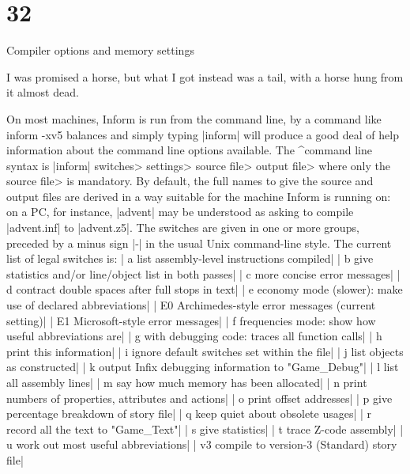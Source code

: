 {{\newpage
\section{32}{Compiler options and memory settings}

\verywidepoem
I was promised a horse, but what I got instead
was a tail, with a horse hung from it almost dead.

\ninepoint
{}
\medskip
\noindent
On most machines, Inform is run from the command line, by a command like
\beginstt
inform -xv5 balances
\endtt
and simply typing |inform| will produce a good deal of help information
about the command line options available.  The ^{command line syntax} is
\begindisplay
|inform| \<switches> \<settings> \<source file> \<output file>
\enddisplay
where only the \<source file> is mandatory.  By default, the full names to
give the source and output files are derived in a way suitable for the machine
Inform is running on: on a PC, for instance, |advent| may be understood as
asking to compile |advent.inf| to |advent.z5|.
\medskip\noindent
The switches are given in one or more groups, preceded by a minus sign |-|
in the usual Unix command-line style.  The current list of legal switches is:
\beginlines
|  a   list assembly-level instructions compiled|
|  b   give statistics and/or line/object list in both passes|
|  c   more concise error messages|
|  d   contract double spaces after full stops in text|
|  e   economy mode (slower): make use of declared abbreviations|
|  E0  Archimedes-style error messages (current setting)|
|  E1  Microsoft-style error messages|
|  f   frequencies mode: show how useful abbreviations are|
|  g   with debugging code: traces all function calls|
|  h   print this information|
|  i   ignore default switches set within the file|
|  j   list objects as constructed|
|  k   output Infix debugging information to "Game_Debug"|
|  l   list all assembly lines|
|  m   say how much memory has been allocated|
|  n   print numbers of properties, attributes and actions|
|  o   print offset addresses|
|  p   give percentage breakdown of story file|
|  q   keep quiet about obsolete usages|
|  r   record all the text to "Game_Text"|
|  s   give statistics|
|  t   trace Z-code assembly|
|  u   work out most useful abbreviations|
|  v3  compile to version-3 (Standard) story file|
}}
